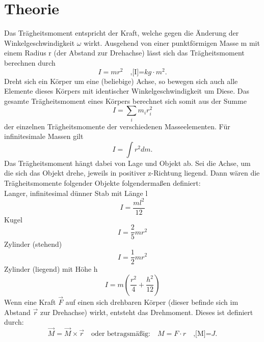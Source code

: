 \section{Theorie}
\label{sec:Theorie}

Das Trägheitsmoment entspricht der Kraft, welche gegen die Änderung der
Winkelgeschwindigkeit $\omega$ wirkt. Ausgehend von einer punktförmigen 
Masse m mit einem Radius r (der Abstand zur Drehachse) lässt sich das 
Trägheitsmoment berechnen durch
\begin{equation}
    I = m r^2 \quad \text{,[I]=} kg \cdot m^2.
    \label{eqn:gl1}
\end{equation}
\noindent Dreht sich ein Körper um eine (beliebige) Achse, so bewegen sich auch alle
Elemente dieses Körpers mit identischer Winkelgeschwindigkeit um Diese. Das
gesamte Trägheitsmoment eines Körpers berechnet sich somit aus der Summe
\begin{equation}
    I = \sum\limits_{i} m_i r_i^2
    \label{eqn:gl2}
\end{equation}
\noindent der einzelnen Trägheitsmomente der verschiedenen Masseelementen. Für
infinitesimale Massen gilt
\begin{equation}
    I = \int r^2 dm .
    \label{eqn:gl3}
\end{equation}
\noindent Das Trägheitsmoment hängt dabei von Lage und Objekt ab. Sei die
Achse, um die sich das Objekt drehe, jeweils in positiver z-Richtung liegend.
Dann wären die Trägheitsmomente folgender Objekte folgendermaßen definiert:\\
\noindent Langer, infinitesimal dünner Stab mit Länge l
\begin{equation}
    I = \frac{ml^2}{12}
    \label{eqn:gl4}
\end{equation}
Kugel
\begin{equation}
    I = \frac{2}{5} m r^2
    \label{eqn:gl5}
\end{equation}
Zylinder (stehend)
\begin{equation}
    I = \frac{1}{2} m r^2
    \label{eqn:gl6}
\end{equation}
Zylinder (liegend) mit Höhe h
\begin{equation}
    I = m \left(\frac{r^2}{4} + \frac{h^2}{12} \right) 
    \label{eqn:gl7}
\end{equation}
Wenn eine Kraft $\vec{F}$ auf einen sich drehbaren Körper (dieser befinde
sich im Abstand $\vec{r}$ zur Drehachse) wirkt, entsteht das Drehmoment.
Dieses ist definiert durch:
\begin{equation}
    \vec{M} = \vec{M} \times \vec{r} \quad \text{oder betragsmäßig:} 
    \quad M = F \cdot r \quad \text{,[M]=} J.\end{equation}
